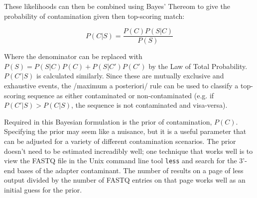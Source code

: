 \documentclass{bioinfo}
\begin{document}
\begin{methods}
These likelihoods can then be combined using Bayes' Thereom to give
the probability of contamination given then top-scoring match:

$$ P(C|S) = \frac{P(C) P(S|C)}{P(S)} $$

Where the denominator can be replaced with $P(S) = P(S | C)P(C) +
P(S | C') P(C')$ by the Law of Total Probability. $P(C'|S)$ is
calculated similarly. Since these are mutually exclusive and
exhaustive events, the /maximum a posteriori/ rule can be used to
classify a top-scoring sequence as either contaminated or
non-contaminated (e.g. if $P(C'|S) > P(C|S)$, the sequence is not
contaminated and visa-versa).

Required in this Bayesian formulation is the prior of contamination,
$P(C)$. Specifying the prior may seem like a nuisance, but it is a
useful parameter that can be adjusted for a variety of different
contamination scenarios. The prior doesn't need to be estimated
increadibly well; one technique that works well is to view the FASTQ
file in the Unix command line tool \texttt{less} and search for the
3'-end bases of the adapter contaminant. The number of results on a
page of less output divided by the number of FASTQ entries on that
page works well as an initial guess for the prior.



\end{methods}
\end{document}
